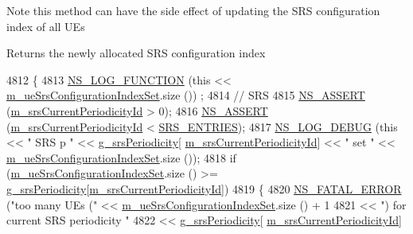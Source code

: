 \begin{DoxyNote}{Note}
this method can have the side effect of updating the S\+RS configuration index of all U\+Es
\end{DoxyNote}
\begin{DoxyReturn}{Returns}
the newly allocated S\+RS configuration index 
\end{DoxyReturn}

\begin{DoxyCode}
4812 \{
4813   \hyperlink{log-macros-disabled_8h_a90b90d5bad1f39cb1b64923ea94c0761}{NS\_LOG\_FUNCTION} (\textcolor{keyword}{this} << \hyperlink{classns3_1_1LteEnbRrc_a1807b21ca2e25c55dcbea00ca8657aaa}{m\_ueSrsConfigurationIndexSet}.size ())
      ;
4814   \textcolor{comment}{// SRS}
4815   \hyperlink{assert_8h_a6dccdb0de9b252f60088ce281c49d052}{NS\_ASSERT} (\hyperlink{classns3_1_1LteEnbRrc_abf0c77f8f27fff5a4e00608a6c822a8b}{m\_srsCurrentPeriodicityId} > 0);
4816   \hyperlink{assert_8h_a6dccdb0de9b252f60088ce281c49d052}{NS\_ASSERT} (\hyperlink{classns3_1_1LteEnbRrc_abf0c77f8f27fff5a4e00608a6c822a8b}{m\_srsCurrentPeriodicityId} < 
      \hyperlink{namespacens3_aaf5b96bcac774c553e55e91b666eea7e}{SRS\_ENTRIES});
4817   \hyperlink{group__logging_ga413f1886406d49f59a6a0a89b77b4d0a}{NS\_LOG\_DEBUG} (\textcolor{keyword}{this} << \textcolor{stringliteral}{" SRS p "} << \hyperlink{namespacens3_ab94f9219b63d35668c344ae7c4da9cb5}{g\_srsPeriodicity}[
      \hyperlink{classns3_1_1LteEnbRrc_abf0c77f8f27fff5a4e00608a6c822a8b}{m\_srsCurrentPeriodicityId}] << \textcolor{stringliteral}{" set "} << 
      \hyperlink{classns3_1_1LteEnbRrc_a1807b21ca2e25c55dcbea00ca8657aaa}{m\_ueSrsConfigurationIndexSet}.size ());
4818   \textcolor{keywordflow}{if} (\hyperlink{classns3_1_1LteEnbRrc_a1807b21ca2e25c55dcbea00ca8657aaa}{m\_ueSrsConfigurationIndexSet}.size () >= 
      \hyperlink{namespacens3_ab94f9219b63d35668c344ae7c4da9cb5}{g\_srsPeriodicity}[\hyperlink{classns3_1_1LteEnbRrc_abf0c77f8f27fff5a4e00608a6c822a8b}{m\_srsCurrentPeriodicityId}])
4819     \{
4820       \hyperlink{group__fatal_ga5131d5e3f75d7d4cbfd706ac456fdc85}{NS\_FATAL\_ERROR} (\textcolor{stringliteral}{"too many UEs ("} << 
      \hyperlink{classns3_1_1LteEnbRrc_a1807b21ca2e25c55dcbea00ca8657aaa}{m\_ueSrsConfigurationIndexSet}.size () + 1 
4821                                        << \textcolor{stringliteral}{") for current SRS periodicity "}
4822                                        <<  \hyperlink{namespacens3_ab94f9219b63d35668c344ae7c4da9cb5}{g\_srsPeriodicity}[
      \hyperlink{classns3_1_1LteEnbRrc_abf0c77f8f27fff5a4e00608a6c822a8b}{m\_srsCurrentPeriodicityId}]

\end{DoxyCode}
